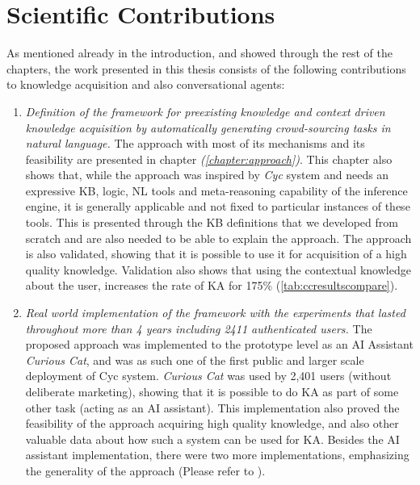 \section{Scientific Contributions}
As mentioned already in the introduction, and showed through the rest of the
chapters, the work presented in this thesis consists of the following 
contributions to knowledge acquisition and also conversational agents:
\begin{enumerate}
	\item \emph{Definition of the framework for preexisting knowledge and
	context	driven knowledge acquisition by automatically generating 
	crowd-sourcing tasks in natural language.} The approach with most of its
	 mechanisms and its feasibility are presented in chapter 
	 \emph{ (\autoref{chapter:approach})}. 
	This chapter
	also shows that, while the approach was inspired by \emph{Cyc} system and needs an expressive KB, logic,	NL tools and meta-reasoning capability of
	the inference engine, it is generally applicable and not fixed to
	particular instances of these tools. This is presented through the 
	KB	definitions that we developed from scratch and are also needed to be
	able to explain the approach. The approach is also validated, showing that
	it is possible to use it for acquisition of a high quality knowledge. 
	Validation also shows that using the contextual knowledge about the user,
	increases the rate of KA for 175\% (\autoref{tab:ccresultscompare}).
	
	\item \emph{Real world implementation of the framework with the experiments 
	that lasted throughout more than 4 years including 2411 authenticated 
	users.} The proposed approach was implemented to the prototype level as an AI Assistant \emph{Curious Cat}, and was as such one of the first public and larger scale deployment of Cyc system. \emph{Curious Cat} was used by
	 2,401 users (without deliberate marketing), showing that it is possible to
	 do KA as part of some
	other task (acting as an AI assistant). This implementation also proved 
	the feasibility of the approach acquiring high quality knowledge, and 
	also other valuable data about how such a system can be used for KA. Besides
	the AI assistant implementation, there were two more implementations, 
	emphasizing the generality of the approach (Please refer to ).


\end{enumerate}
